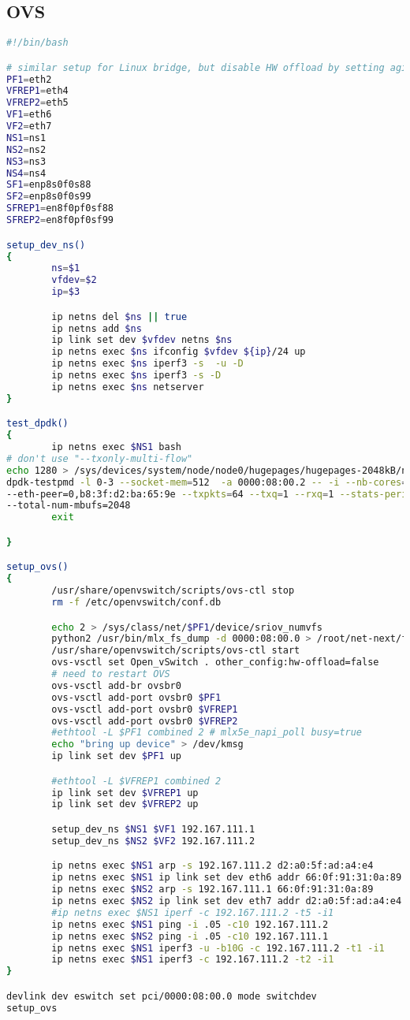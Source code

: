 \subsection{OVS}
\begin{lstlisting}[language=sh, caption={Bash Script for Database Backup}, label={lst:bash_script}]
#!/bin/bash

# similar setup for Linux bridge, but disable HW offload by setting aging=0
PF1=eth2
VFREP1=eth4
VFREP2=eth5
VF1=eth6
VF2=eth7
NS1=ns1
NS2=ns2
NS3=ns3
NS4=ns4
SF1=enp8s0f0s88
SF2=enp8s0f0s99
SFREP1=en8f0pf0sf88
SFREP2=en8f0pf0sf99

setup_dev_ns()
{
        ns=$1
        vfdev=$2
        ip=$3

        ip netns del $ns || true
        ip netns add $ns
        ip link set dev $vfdev netns $ns
        ip netns exec $ns ifconfig $vfdev ${ip}/24 up
        ip netns exec $ns iperf3 -s  -u -D
        ip netns exec $ns iperf3 -s -D
        ip netns exec $ns netserver
}

test_dpdk()
{
        ip netns exec $NS1 bash
# don't use "--txonly-multi-flow"
echo 1280 > /sys/devices/system/node/node0/hugepages/hugepages-2048kB/nr_hugepages
dpdk-testpmd -l 0-3 --socket-mem=512  -a 0000:08:00.2 -- -i --nb-cores=1 --forward-mode=txonly \
--eth-peer=0,b8:3f:d2:ba:65:9e --txpkts=64 --txq=1 --rxq=1 --stats-period=1 --txonly-multi-flow \
--total-num-mbufs=2048
        exit

}

setup_ovs()
{
        /usr/share/openvswitch/scripts/ovs-ctl stop
        rm -f /etc/openvswitch/conf.db

        echo 2 > /sys/class/net/$PF1/device/sriov_numvfs
        python2 /usr/bin/mlx_fs_dump -d 0000:08:00.0 > /root/net-next/fdb.txt
        /usr/share/openvswitch/scripts/ovs-ctl start
        ovs-vsctl set Open_vSwitch . other_config:hw-offload=false 
        # need to restart OVS
        ovs-vsctl add-br ovsbr0
        ovs-vsctl add-port ovsbr0 $PF1
        ovs-vsctl add-port ovsbr0 $VFREP1
        ovs-vsctl add-port ovsbr0 $VFREP2
        #ethtool -L $PF1 combined 2 # mlx5e_napi_poll busy=true
        echo "bring up device" > /dev/kmsg
        ip link set dev $PF1 up

        #ethtool -L $VFREP1 combined 2
        ip link set dev $VFREP1 up
        ip link set dev $VFREP2 up

        setup_dev_ns $NS1 $VF1 192.167.111.1
        setup_dev_ns $NS2 $VF2 192.167.111.2

        ip netns exec $NS1 arp -s 192.167.111.2 d2:a0:5f:ad:a4:e4
        ip netns exec $NS1 ip link set dev eth6 addr 66:0f:91:31:0a:89
        ip netns exec $NS2 arp -s 192.167.111.1 66:0f:91:31:0a:89
        ip netns exec $NS2 ip link set dev eth7 addr d2:a0:5f:ad:a4:e4
        #ip netns exec $NS1 iperf -c 192.167.111.2 -t5 -i1
        ip netns exec $NS1 ping -i .05 -c10 192.167.111.2
        ip netns exec $NS2 ping -i .05 -c10 192.167.111.1
        ip netns exec $NS1 iperf3 -u -b10G -c 192.167.111.2 -t1 -i1
        ip netns exec $NS1 iperf3 -c 192.167.111.2 -t2 -i1
}

devlink dev eswitch set pci/0000:08:00.0 mode switchdev
setup_ovs
\end{lstlisting}
